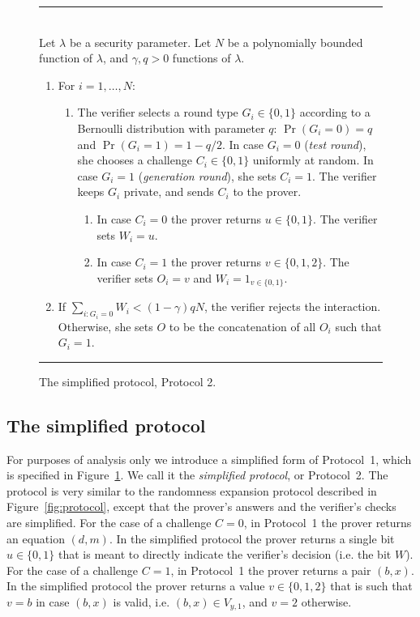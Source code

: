 \documentclass[11pt]{article}
\theoremstyle{remark}
\theoremstyle{definition}
\begin{document}
\begin{figure}[htbp]
\rule[1ex]{16.5cm}{0.5pt}\\
Let $\lambda$ be a security parameter. Let $N$ be a polynomially bounded function of $\lambda$, and $\gamma,q>0$ functions of $\lambda$. 
\begin{enumerate}
\item For $i=1,\ldots,N$:
\begin{enumerate}
\item The verifier selects a round type $G_i \in \{0,1\}$ according to a Bernoulli  distribution with parameter $q$: $\Pr(G_i=0)=q$ and $\Pr(G_i=1)=1-q/2$. In case $G_i=0$ (\emph{test round}), she chooses a challenge $C_i\in \{0,1\}$ uniformly at random. In case $G_i=1$ (\emph{generation round}), she sets $C_i=1$. The verifier keeps $G_i$ private, and sends $C_i$ to the prover. 
\begin{enumerate}
\item In case $C_i=0$ the prover returns $u\in\{0,1\}$. The verifier sets $W_i = u$.  
\item In case $C_i=1$ the prover returns $v\in\{0,1,2\}$. The verifier sets $O_i=v$ and $W_i = 1_{v\in\{0,1\}}$.   
\end{enumerate}
\end{enumerate}
\item If $\sum_{i: G_i=0} W_i < (1-\gamma)qN$, the verifier rejects the interaction. Otherwise, she sets $O$ to be the concatenation of all $O_i$ such that $G_i=1$.
\end{enumerate}
\rule[1ex]{16.5cm}{0.5pt}
\caption{The simplified protocol, Protocol 2.}
\label{fig:protocol2}
\end{figure}


\subsection{The simplified protocol}
\label{sec:si-protocol}

For purposes of analysis only we introduce a simplified form of Protocol~1, which is specified in Figure~\ref{fig:protocol2}. We call it the \emph{simplified protocol}, or Protocol~2. The protocol is very similar to the randomness expansion protocol described in Figure~\ref{fig:protocol}, except that the prover's answers and the verifier's checks are simplified. For the case of a challenge $C=0$, in Protocol~1 the prover returns an equation $(d,m)$. In the simplified protocol the prover returns a single bit $u\in\{0,1\}$ that is meant to directly indicate the verifier's decision (i.e. the bit $W$). For the case of a challenge $C=1$, in Protocol~1 the prover returns a pair $(b,x)$. In the simplified protocol the prover returns a value $v\in\{0,1,2\}$ that is such that $v=b$ in case $(b,x)$ is valid, i.e. $(b,x)\in V_{y,1}$, and $v=2$ otherwise. 
\end{document}
